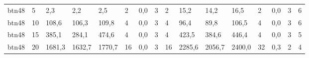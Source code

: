 \begin{table}[]
\begin{tabular}{llllllllllllllll}
		btn48   & 5      & 2,3                                                 & 2,2                                                 & 2,5                                                 & 2                                                   & 0,0                                                 & 3      & 2                                                         & 15,2                                                & 14,2                                                & 16,5                                                & 2                                                   & 0,0                                                 & 3      & 6                                                         \\
		btn48   & 10     & 108,6                                               & 106,3                                               & 109,8                                               & 4                                                   & 0,0                                                 & 3      & 4                                                         & 96,4                                                & 89,8                                                & 106,5                                               & 4                                                   & 0,0                                                 & 3      & 6                                                         \\
		btn48   & 15     & 385,1                                               & 284,1                                               & 474,6                                               & 4                                                   & 0,0                                                 & 3      & 4                                                         & 423,5                                               & 384,6                                               & 446,4                                               & 4                                                   & 0,0                                                 & 3      & 5                                                         \\
		btn48   & 20     & 1681,3                                              & 1632,7                                              & 1770,7                                              & 16                                                  & 0,0                                                 & 3      & 16                                                        & 2285,6                                              & 2056,7                                              & 2400,0                                              & 32                                                  & 0,3                                                 & 2      & 4                                                         \\

\end{tabular}
\end{table}
